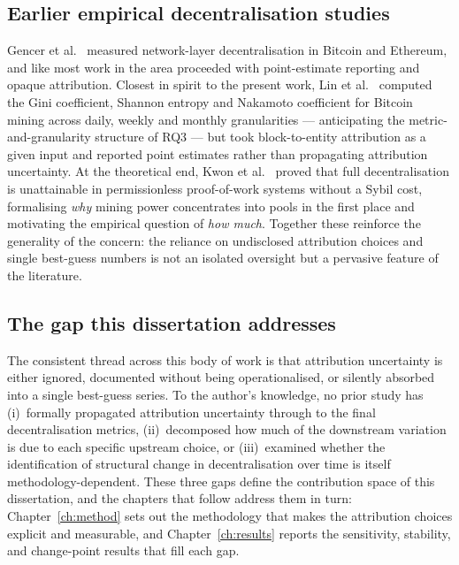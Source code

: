 \documentclass[logo,msc]{infthesis}           %
\begin{document}
\subsection{Earlier empirical decentralisation studies}
 
Gencer et al.~\cite{gencer2018decentralization} measured network-layer
decentralisation in Bitcoin and Ethereum, and like most work in the area
proceeded with point-estimate reporting and opaque attribution. Closest in
spirit to the present work, Lin et al.~\cite{lin2021measuring} computed the
Gini coefficient, Shannon entropy and Nakamoto coefficient for Bitcoin mining
across daily, weekly and monthly granularities --- anticipating the
metric-and-granularity structure of RQ3 --- but took block-to-entity
attribution as a given input and reported point estimates rather than
propagating attribution uncertainty. At the theoretical end, Kwon et
al.~\cite{kwon2019impossibility} proved that full decentralisation is
unattainable in permissionless proof-of-work systems without a Sybil cost,
formalising \emph{why} mining power concentrates into pools in the first place
and motivating the empirical question of \emph{how much}. Together these
reinforce the generality of the concern: the reliance on undisclosed
attribution choices and single best-guess numbers is not an isolated oversight
but a pervasive feature of the literature.
 
\subsection{The gap this dissertation addresses}
 
The consistent thread across this body of work is that attribution uncertainty
is either ignored, documented without being operationalised, or silently
absorbed into a single best-guess series. To the author's knowledge, no prior
study has (i)~formally propagated attribution uncertainty through to the final
decentralisation metrics, (ii)~decomposed how much of the downstream variation
is due to each specific upstream choice, or (iii)~examined whether the
identification of structural change in decentralisation over time is itself
methodology-dependent. These three gaps define the contribution space of this
dissertation, and the chapters that follow address them in turn:
Chapter~\ref{ch:method} sets out the methodology that makes the attribution
choices explicit and measurable, and Chapter~\ref{ch:results} reports the
sensitivity, stability, and change-point results that fill each gap.
\end{document}
